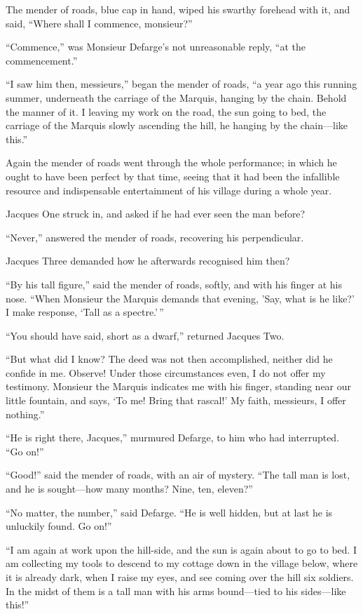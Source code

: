 The mender of roads, blue cap in hand, wiped his swarthy forehead with
it, and said, ``Where shall I commence, monsieur?''

``Commence,'' was Monsieur Defarge's not unreasonable reply, ``at the
commencement.''

``I saw him then, messieurs,'' began the mender of roads, ``a year ago
this running summer, underneath the carriage of the Marquis, hanging by
the chain.  Behold the manner of it.  I leaving my work on the road,
the sun going to bed, the carriage of the Marquis slowly ascending
the hill, he hanging by the chain---like this.''

Again the mender of roads went through the whole performance; in which
he ought to have been perfect by that time, seeing that it had been
the infallible resource and indispensable entertainment of his village
during a whole year.

Jacques One struck in, and asked if he had ever seen the man before?

``Never,'' answered the mender of roads, recovering his perpendicular.

Jacques Three demanded how he afterwards recognised him then?

``By his tall figure,'' said the mender of roads, softly, and with his
finger at his nose.  ``When Monsieur the Marquis demands that evening,
'Say, what is he like?' I make response, `Tall as a spectre.'\,''

``You should have said, short as a dwarf,'' returned Jacques Two.

``But what did I know?  The deed was not then accomplished, neither did
he confide in me.  Observe!  Under those circumstances even, I do not
offer my testimony.  Monsieur the Marquis indicates me with his finger,
standing near our little fountain, and says, `To me!  Bring that rascal!'
My faith, messieurs, I offer nothing.''

``He is right there, Jacques,'' murmured Defarge, to him who had
interrupted.  ``Go on!''

``Good!'' said the mender of roads, with an air of mystery.  ``The tall
man is lost, and he is sought---how many months?  Nine, ten, eleven?''

``No matter, the number,'' said Defarge.  ``He is well hidden, but at last
he is unluckily found.  Go on!''

``I am again at work upon the hill-side, and the sun is again about to
go to bed.  I am collecting my tools to descend to my cottage down in
the village below, where it is already dark, when I raise my eyes,
and see coming over the hill six soldiers.  In the midst of them
is a tall man with his arms bound---tied to his sides---like this!''

